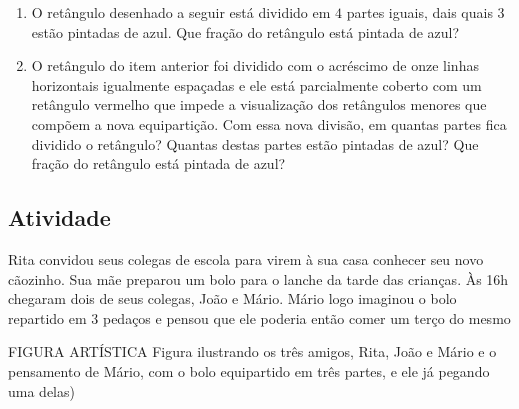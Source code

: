 \documentclass[a4,12pt]{book}
\begin{document}
\begin{enumerate} [\quad a)] %
  \item     O retângulo desenhado a seguir está dividido em     $4$     partes iguais, dais quais     $3$     estão pintadas de azul. Que fração do retângulo está pintada de azul?       
  \begin{center}
\end{center}

\item     O retângulo do item anterior foi dividido com o acréscimo de onze linhas horizontais igualmente espaçadas e ele está parcialmente coberto com um retângulo vermelho que impede a visualização dos retângulos menores que compõem a nova equipartição. Com essa nova divisão, em quantas partes fica dividido o retângulo? Quantas destas partes estão pintadas de azul? Que fração do retângulo está pintada de azul?     \mbox{} \newline      
\end{enumerate} %

\begin{center}
\end{center}

\subsection{Atividade}
Rita convidou seus colegas de escola para virem à sua casa conhecer seu novo cãozinho. Sua mãe preparou um bolo para o lanche da tarde das crianças. Às 16h chegaram dois de seus colegas, João e Mário. Mário logo imaginou o bolo repartido em 3 pedaços e pensou que ele poderia então comer um terço do mesmo 

\begin{imagem*}[breakable]{}{}   FIGURA ARTÍSTICA  
  Figura ilustrando os três amigos, Rita, João e Mário e o pensamento de Mário, com o bolo equipartido em três partes, e ele já pegando uma delas)  
\end{imagem*}
\end{document}
